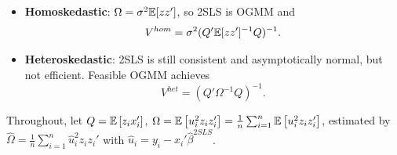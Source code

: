 \begin{remark}
	\begin{itemize}
		\item \textbf{Homoskedastic}: $\Omega = \sigma^2\mathbb{E}[zz']$, so 2SLS is OGMM and
		\[
			V^{hom} = \sigma^2(Q'\mathbb{E}[zz']^{-1}Q)^{-1}
		.\]
		\item \textbf{Heteroskedastic}: 2SLS is still consistent and asymptotically normal, but not efficient. Feasible OGMM achieves
		\[
			V^{het} = (Q'\Omega^{-1}Q)^{-1}
		.\]
	\end{itemize}
\end{remark}

\begin{remark}
	\leavevmode\hfill\break
	Throughout, let $Q = \mathbb{E}\left[z_i x_i'\right]$, $\Omega = \mathbb{E}\left[u_i^2 z_i z_i'\right] = \frac{1}{n}\sum_{i=1}^{n} \mathbb{E}\left[u_i^2 z_i z_i'\right]$, estimated by $\hat{\Omega} = \frac{1}{n}\sum_{i=1}^{n}\hat{u}_i^2 z_i z_i'$ with $\hat{u}_i = y_i - x_i'\hat{\beta}^{2SLS}$.


\end{remark}
